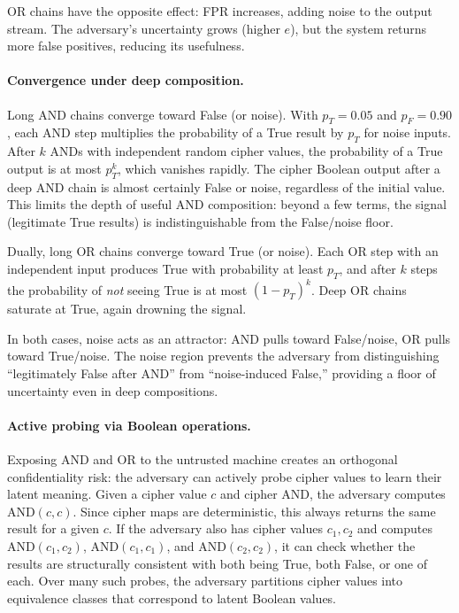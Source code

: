 \documentclass[11pt]{article}
\theoremstyle{definition}
\theoremstyle{plain}
\theoremstyle{remark}
\begin{document}
OR chains have the opposite effect: FPR increases, adding noise to the
output stream.
The adversary's uncertainty grows (higher $e$), but the system returns
more false positives, reducing its usefulness.

\paragraph{Convergence under deep composition.}
Long AND chains converge toward False (or noise).
With $p_T = 0.05$ and $p_F = 0.90$, each AND step multiplies the
probability of a True result by $p_T$ for noise inputs.
After $k$ ANDs with independent random cipher values, the probability
of a True output is at most $p_T^k$, which vanishes rapidly.
The cipher Boolean output after a deep AND chain is almost certainly
False or noise, regardless of the initial value.
This limits the depth of useful AND composition: beyond a few
terms, the signal (legitimate True results) is indistinguishable from
the False/noise floor.

Dually, long OR chains converge toward True (or noise).
Each OR step with an independent input produces True with probability
at least $p_T$, and after $k$ steps the probability of \emph{not} seeing
True is at most $(1 - p_T)^k$.
Deep OR chains saturate at True, again drowning the signal.

In both cases, noise acts as an attractor: AND pulls toward False/noise,
OR pulls toward True/noise.
The noise region prevents the adversary from distinguishing
``legitimately False after AND'' from ``noise-induced False,'' providing
a floor of uncertainty even in deep compositions.

\paragraph{Active probing via Boolean operations.}
Exposing AND and OR to the untrusted machine creates an orthogonal
confidentiality risk: the adversary can actively probe cipher values to
learn their latent meaning.
Given a cipher value $c$ and cipher AND, the adversary computes
$\mathrm{AND}(c, c)$.
Since cipher maps are deterministic, this always returns the same result
for a given $c$.
If the adversary also has cipher values $c_1, c_2$ and computes
$\mathrm{AND}(c_1, c_2)$, $\mathrm{AND}(c_1, c_1)$, and
$\mathrm{AND}(c_2, c_2)$, it can check whether the results are
structurally consistent with both being True, both False, or one of each.
Over many such probes, the adversary partitions cipher values into
equivalence classes that correspond to latent Boolean values.
\end{document}
